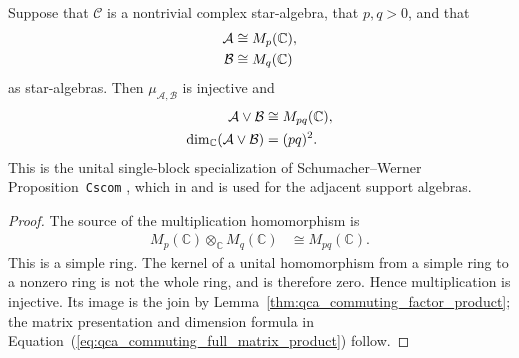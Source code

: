 \begin{lemma}
    \label{thm:qca_commuting_full_matrix_product}
    \leanok
    Suppose that $\mathcal C$ is a nontrivial complex star-algebra,
    that $p,q>0$, and that
    \begin{align}
        \mathcal A & \cong M_p(\mathbb C), \notag \\
        \mathcal B & \cong M_q(\mathbb C)
    \end{align}
    as star-algebras.  Then $\mu_{\mathcal A,\mathcal B}$ is injective and
    \begin{align}
        \mathcal A\vee\mathcal B
         & \cong M_{pq}(\mathbb C), \notag \\
        \dim_{\mathbb C}(\mathcal A\vee\mathcal B)
         & =(pq)^2.
        \label{eq:qca_commuting_full_matrix_product}
    \end{align}
    This is the unital single-block specialization of Schumacher--Werner
    Proposition~\texttt{Cscom}
    \cite[lines~2119--2138]{SchumacherWerner2004QCA}, which in \cite[lines~1270--1308]{Gross2012IndexTheory} and \cite{gap:gnvw12_cscom_single_block_scope} is used for the adjacent
    support
    algebras.
\end{lemma}

\begin{proof}\leanok
    The source of the multiplication homomorphism is
    \begin{align}
        M_p(\mathbb C)\otimes_{\mathbb C}M_q(\mathbb C)
         & \cong M_{pq}(\mathbb C).
    \end{align}
    This is a simple ring.  The kernel of a unital homomorphism from a
    simple ring to a nonzero ring is not the whole ring, and is therefore
    zero.  Hence multiplication is injective.  Its image is the join by
    Lemma~\ref{thm:qca_commuting_factor_product}; the matrix presentation
    and dimension formula in
    Equation~(\ref{eq:qca_commuting_full_matrix_product}) follow.
\end{proof}

